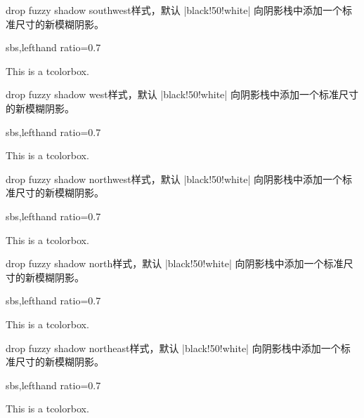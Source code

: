 \begin{docTcbKey}{drop fuzzy shadow southwest}{}{样式，默认 |black!50!white|}
  向阴影栈中添加一个标准尺寸的新模糊阴影。
\begin{dispExample*}{sbs,lefthand ratio=0.7}
\begin{tcolorbox}[drop fuzzy shadow southwest,
  enhanced,colback=red!5!white,colframe=red!75!black]
  This is a tcolorbox.
\end{tcolorbox}
\end{dispExample*}
\end{docTcbKey}%

\begin{docTcbKey}{drop fuzzy shadow west}{}{样式，默认 |black!50!white|}
  向阴影栈中添加一个标准尺寸的新模糊阴影。
\begin{dispExample*}{sbs,lefthand ratio=0.7}
\begin{tcolorbox}[drop fuzzy shadow west,
  enhanced,colback=red!5!white,colframe=red!75!black]
  This is a tcolorbox.
\end{tcolorbox}
\end{dispExample*}
\end{docTcbKey}%

\clearpage
\begin{docTcbKey}{drop fuzzy shadow northwest}{}{样式，默认 |black!50!white|}
  向阴影栈中添加一个标准尺寸的新模糊阴影。
\begin{dispExample*}{sbs,lefthand ratio=0.7}
\begin{tcolorbox}[drop fuzzy shadow northwest,
  enhanced,colback=red!5!white,colframe=red!75!black]
  This is a tcolorbox.
\end{tcolorbox}
\end{dispExample*}
\end{docTcbKey}%

\begin{docTcbKey}{drop fuzzy shadow north}{}{样式，默认 |black!50!white|}
  向阴影栈中添加一个标准尺寸的新模糊阴影。
\begin{dispExample*}{sbs,lefthand ratio=0.7}
\begin{tcolorbox}[drop fuzzy shadow north,
  enhanced,colback=red!5!white,colframe=red!75!black]
  This is a tcolorbox.
\end{tcolorbox}
\end{dispExample*}
\end{docTcbKey}%

\begin{docTcbKey}{drop fuzzy shadow northeast}{}{样式，默认 |black!50!white|}
  向阴影栈中添加一个标准尺寸的新模糊阴影。
\begin{dispExample*}{sbs,lefthand ratio=0.7}
\begin{tcolorbox}[drop fuzzy shadow northeast,
  enhanced,colback=red!5!white,colframe=red!75!black]
  This is a tcolorbox.
\end{tcolorbox}
\end{dispExample*}
\end{docTcbKey}%

